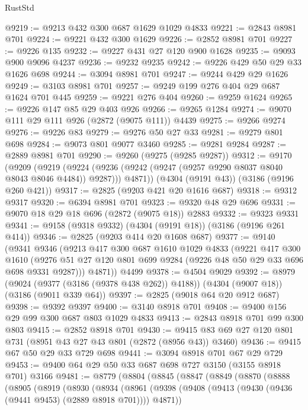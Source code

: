\begin{lexlean}{RustStd}
\begin{coremodule}
@9219 := @9213 @432 @300 @687 @1629 @1029 @4833
@9221 := @2843 @8981 @701
@9224 := @9221 @432 @300 @1629
@9226 := @2852 @8981 @701
@9227 := @9226 @135
@9232 := @9227 @431 @27 @120 @900 @1628
@9235 := @9093 @900 @9096 @4237
@9236 := @9232 @9235
@9242 := @9226 @429 @50 @29 @33 @1626 @698
@9244 := @3094 @8981 @701
@9247 := @9244 @429 @29 @1626
@9249 := @3103 @8981 @701
@9257 := @9249 @199 @276 @404 @29 @687 @1624 @701 @445
@9259 := @9221 @276 @404
@9260 := @9259 @1624
@9265 := @9226 @147 @85 @29 @403 @926
@9266 := @9265 @1284
@9274 := @9070 @111 @29 @111 @926 (@2872 (@9075 @111)) @4439
@9275 := @9266 @9274
@9276 := @9226 @83
@9279 := @9276 @50 @27 @33
@9281 := @9279 @801 @698
@9284 := @9073 @801 @9077 @3460
@9285 := @9281 @9284
@9287 := @2889 @8981 @701
@9290 := @9260 (@9275 (@9285 @9287))
@9312 := @9170
    (@9209
      (@9219
        (@9224 (@9236 (@9242 (@9247 (@9257 @9290 @8037 @8040 @8043 @8046 @4484)) @9287)))
        @4871))
    (@4304 (@9191 @43))
    (@3186 (@9196 @260 @421))
@9317 := @2825 (@9203 @421 @20 @1616 @687)
@9318 := @9312 @9317
@9320 := @6394 @8981 @701
@9323 := @9320 @48 @29 @696
@9331 := @9070 @18 @29 @18 @696 (@2872 (@9075 @18)) @2883
@9332 := @9323 @9331
@9341 := @9158 (@9318 @9332) (@4304 (@9191 @18)) (@3186 (@9196 @261 @414))
@9346 := @2825 (@9203 @414 @20 @1608 @687)
@9377 := @9140
    (@9341
      @9346
      (@9213
        @417
        @300
        @687
        @1610
        @1029
        @4833
        (@9221
          @417
          @300
          @1610
          (@9276 @51 @27 @120 @801 @699 @9284 (@9226 @48 @50 @29 @33 @696 @698 @9331 @9287)))
        @4871))
    @4499
@9378 := @4504 @9029
@9392 := @8979
    (@9024 (@9377 (@3186 (@9378 @438 @262)) @4188))
    (@4304 (@9007 @18))
    (@3186 (@9011 @339 @64))
@9397 := @2825 (@9018 @64 @20 @912 @687)
@9398 := @9392 @9397
@9400 := @3140 @8918 @701
@9408 := @9400 @156 @29 @99 @300 @687 @803 @1029 @4833
@9413 := @2843 @8918 @701 @99 @300 @803
@9415 := @2852 @8918 @701
@9430 := @9415 @83 @69 @27 @120 @801 @731 (@8951 @43 @27 @43 @801 (@2872 (@8956 @43)) @3460)
@9436 := @9415 @67 @50 @29 @33 @729 @698
@9441 := @3094 @8918 @701 @67 @29 @729
@9453 := @9400 @64 @29 @50 @33 @687 @698 @727 @3150 (@3155 @8918 @701) @3166
@9481 := @8779
    (@8804
      (@8845
        (@8847
          (@8849
            (@8870
              (@8888
                (@8905
                  (@8919
                    (@8930
                      (@8934
                        (@8961
                          (@9398
                            (@9408 (@9413 (@9430 (@9436 (@9441 @9453) (@2889 @8918 @701)))) @4871))

\end{coremodule}
\end{lexlean}
